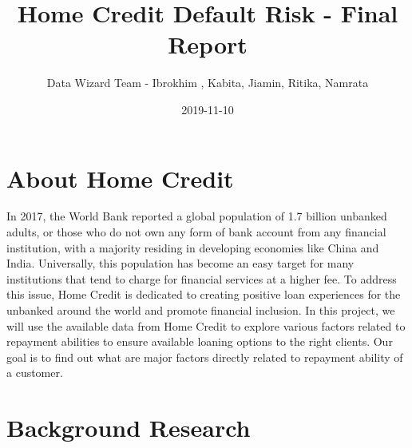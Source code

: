 \documentclass[]{book}
\title{Home Credit Default Risk - Final Report}
\author{Data Wizard Team - Ibrokhim , Kabita, Jiamin, Ritika, Namrata}
\date{2019-11-10}
\begin{document}
\maketitle

{
\setcounter{tocdepth}{1}
\tableofcontents
}
\hypertarget{about-home-credit}{%
\chapter{About Home Credit}\label{about-home-credit}}

In 2017, the World Bank reported a global population of 1.7 billion unbanked adults, or those who do not own any form of bank account from any financial institution, with a majority residing in developing economies like China and India. Universally, this population has become an easy target for many institutions that tend to charge for financial services at a higher fee. To address this issue, Home Credit is dedicated to creating positive loan experiences for the unbanked around the world and promote financial inclusion. In this project, we will use the available data from Home Credit to explore various factors related to repayment abilities to ensure available loaning options to the right clients. Our goal is to find out what are major factors directly related to repayment ability of a customer.

\hypertarget{background-research}{%
\chapter{Background Research}\label{background-research}}
\end{document}
